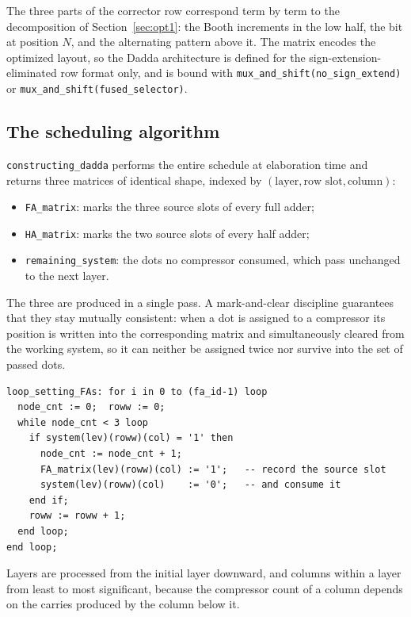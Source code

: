 \documentclass[11pt,a4paper]{article}
\begin{document}
The three parts of the corrector row correspond term by term to the
decomposition of Section~\ref{sec:opt1}: the Booth increments in the low half,
the bit at position $N$, and the alternating pattern above it. The matrix
encodes the optimized layout, so the Dadda architecture is defined for the
sign-extension-eliminated row format only, and is bound with
\texttt{mux\_and\_shift(no\_sign\_extend)} or
\texttt{mux\_and\_shift(fused\_selector)}.

\subsection{The scheduling algorithm}

\texttt{constructing\_dadda} performs the entire schedule at elaboration time
and returns three matrices of identical shape, indexed by
$(\text{layer},\text{row slot},\text{column})$:

\begin{itemize}\itemsep1pt
\item \texttt{FA\_matrix}: marks the three source slots of every full adder;
\item \texttt{HA\_matrix}: marks the two source slots of every half adder;
\item \texttt{remaining\_system}: the dots no compressor consumed, which pass
      unchanged to the next layer.
\end{itemize}

The three are produced in a single pass. A mark-and-clear discipline guarantees
that they stay mutually consistent: when a dot is assigned to a compressor its
position is written into the corresponding matrix and simultaneously cleared
from the working system, so it can neither be assigned twice nor survive into
the set of passed dots.

\begin{lstlisting}[style=vhdl]
loop_setting_FAs: for i in 0 to (fa_id-1) loop
  node_cnt := 0;  roww := 0;
  while node_cnt < 3 loop
    if system(lev)(roww)(col) = '1' then
      node_cnt := node_cnt + 1;
      FA_matrix(lev)(roww)(col) := '1';   -- record the source slot
      system(lev)(roww)(col)    := '0';   -- and consume it
    end if;
    roww := roww + 1;
  end loop;
end loop;
\end{lstlisting}

Layers are processed from the initial layer downward, and columns within a layer
from least to most significant, because the compressor count of a column depends
on the carries produced by the column below it.
\end{document}
